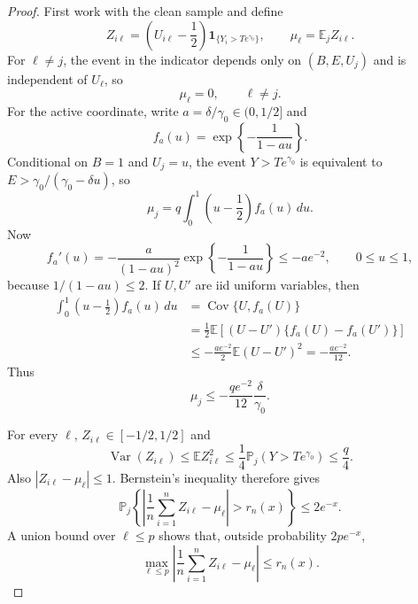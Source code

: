 \documentclass[11pt]{article}
\theoremstyle{remark}
\newcommand{\Pp}{\mathbb P}
\newcommand{\E}{\mathbb E}
\begin{document}
\begin{proof}
First work with the clean sample and define
\begin{equation}
 Z_{i\ell}
 =\left(U_{i\ell}-\frac12\right)
 \mathbf 1_{\{Y_i>Te^{\gamma_0}\}},
 \qquad
 \mu_\ell=\E_j Z_{i\ell}.
 \label{eq:w3-clean-Z}
\end{equation}
For $\ell\ne j$, the event in the indicator depends only on
$(B,E,U_j)$ and is independent of $U_\ell$, so
\begin{equation}
 \mu_\ell=0,
 \qquad \ell\ne j.
 \label{eq:w3-null-mean}
\end{equation}
For the active coordinate, write $a=\delta/\gamma_0\in(0,1/2]$ and
\begin{equation}
 f_a(u)=\exp\left\{-\frac1{1-au}\right\}.
 \label{eq:w3-fa}
\end{equation}
Conditional on $B=1$ and $U_j=u$, the event
$Y>Te^{\gamma_0}$ is equivalent to
$E>\gamma_0/(\gamma_0-\delta u)$, so
\begin{equation}
 \mu_j=q\int_0^1\left(u-\frac12\right)f_a(u)\,du.
 \label{eq:w3-active-mean}
\end{equation}
Now
\begin{equation}
 f_a'(u)=-\frac{a}{(1-au)^2}
 \exp\left\{-\frac1{1-au}\right\}
 \le-ae^{-2},
 \qquad 0\le u\le1,
 \label{eq:w3-fa-derivative}
\end{equation}
because $1/(1-au)\le2$.  If $U,U'$ are iid uniform variables, then
\begin{align}
 \int_0^1\left(u-\frac12\right)f_a(u)\,du
 &=\operatorname{Cov}\{U,f_a(U)\}\nonumber\\
 &=\frac12\E[(U-U')\{f_a(U)-f_a(U')\}]\nonumber\\
 &\le-\frac{ae^{-2}}2\E(U-U')^2
 =-\frac{ae^{-2}}{12}.
 \label{eq:w3-cov-bound}
\end{align}
Thus
\begin{equation}
 \mu_j\le-\frac{q e^{-2}}{12}\frac{\delta}{\gamma_0}.
 \label{eq:w3-active-signal}
\end{equation}

For every $\ell$, $Z_{i\ell}\in[-1/2,1/2]$ and
\begin{equation}
 \operatorname{Var}(Z_{i\ell})
 \le\E Z_{i\ell}^2
 \le\frac14\Pp_j(Y>Te^{\gamma_0})
 \le\frac q4.
 \label{eq:w3-Z-variance}
\end{equation}
Also $|Z_{i\ell}-\mu_\ell|\le1$.  Bernstein's inequality therefore gives
\begin{equation}
 \Pp_j\left\{
 \left|\frac1n\sum_{i=1}^nZ_{i\ell}-\mu_\ell\right|>r_n(x)
 \right\}\le2e^{-x}.
 \label{eq:w3-Bernstein}
\end{equation}
A union bound over $\ell\le p$ shows that, outside probability $2pe^{-x}$,
\begin{equation}
 \max_{\ell\le p}
 \left|\frac1n\sum_{i=1}^nZ_{i\ell}-\mu_\ell\right|
 \le r_n(x).
 \label{eq:w3-clean-uniform}
\end{equation}


\end{proof}
\end{document}
